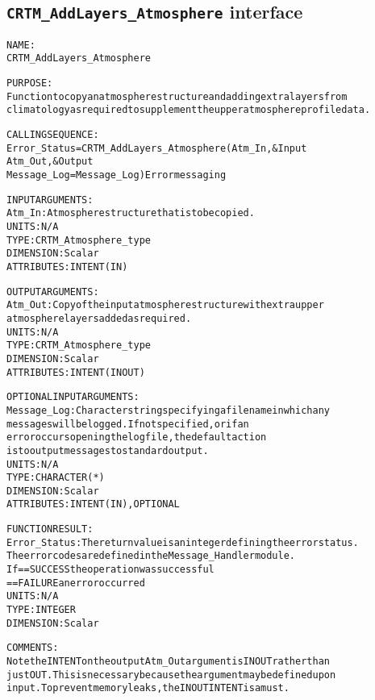 \subsection{\texttt{CRTM\_AddLayers\_Atmosphere} interface}
  \label{sec:CRTM_AddLayers_Atmosphere_interface}
  \begin{alltt}
 
  NAME:
        CRTM_AddLayers_Atmosphere
 
  PURPOSE:
        Function to copy an atmosphere structure and adding extra layers from
        climatology as required to supplement the upper atmosphere profile data.
 
  CALLING SEQUENCE:
        Error_Status = CRTM_AddLayers_Atmosphere( Atm_In                 , &    Input
                                                  Atm_Out                , &    Output
                                                  Message_Log=Message_Log  )    Error messaging
 
  INPUT ARGUMENTS:
        Atm_In:          Atmosphere structure that is to be copied.
                         UNITS:      N/A
                         TYPE:       CRTM_Atmosphere_type
                         DIMENSION:  Scalar
                         ATTRIBUTES: INTENT(IN)
 
  OUTPUT ARGUMENTS:
        Atm_Out:         Copy of the input atmosphere structure with extra upper
                         atmosphere layers added as required.
                         UNITS:      N/A
                         TYPE:       CRTM_Atmosphere_type
                         DIMENSION:  Scalar
                         ATTRIBUTES: INTENT(IN OUT)
 
  OPTIONAL INPUT ARGUMENTS:
        Message_Log:     Character string specifying a filename in which any
                         messages will be logged. If not specified, or if an
                         error occurs opening the log file, the default action
                         is to output messages to standard output.
                         UNITS:      N/A
                         TYPE:       CHARACTER(*)
                         DIMENSION:  Scalar
                         ATTRIBUTES: INTENT(IN), OPTIONAL
 
  FUNCTION RESULT:
        Error_Status:    The return value is an integer defining the error status.
                         The error codes are defined in the Message_Handler module.
                         If == SUCCESS the operation was successful
                            == FAILURE an error occurred
                         UNITS:      N/A
                         TYPE:       INTEGER
                         DIMENSION:  Scalar
 
  COMMENTS:
        Note the INTENT on the output Atm_Out argument is IN OUT rather than
        just OUT. This is necessary because the argument may be defined upon
        input. To prevent memory leaks, the IN OUT INTENT is a must.
 
  \end{alltt}
